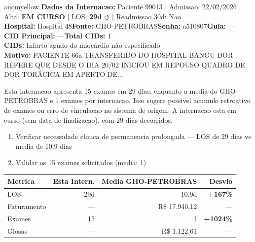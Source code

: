\documentclass[a4paper,10pt]{article}
\begin{document}
\begin{anomalycard}[Internacao 166494 | GHO-PETROBRAS | MODERADO (z=2.42)]{anomyellow}
\textbf{Dados da Internacao:} Paciente 99013 $\mid$ Admissao: 22/02/2026 $\mid$ Alta: \textcolor{anomorange}{\textbf{EM CURSO}} $\mid$ LOS: \textbf{29d \textcolor{anomorange}{$\circlearrowleft$}} $\mid$ Readmissao 30d: Nao\\
\textbf{Hospital:} Hospital 48\quad\textbf{Fonte:} GHO-PETROBRAS\quad\textbf{Senha:} a510807\quad\textbf{Guia:} ---\\
\textbf{CID Principal:} {\small ---}\quad\textbf{Total CIDs:} 1\\

\textbf{CIDs:} {\scriptsize Infarto agudo do miocárdio não especificado}\\

\textbf{Motivo:} {\scriptsize PACIENTE 66a TRANSFERIDO DO HOSPITAL BANGU DOR REFERE QUE DESDE O DIA 20/02 INICIOU EM REPOUSO QUADRO DE DOR TORÁCICA EM APERTO DE...}\\

\vspace{2pt}\begin{tcolorbox}[colback=severityred!20,colframe=anomyellow,title={\textbf{Interpretacao de Negocio}},fonttitle=\bfseries\small,left=4pt,right=4pt,top=3pt,bottom=3pt]
{\small Esta internacao apresenta 15 exames em 29 dias, enquanto a media do GHO-PETROBRAS e 1 exames por internacao. Isso sugere possivel acumulo retroativo de exames ou erro de vinculacao no sistema de origem. A internacao esta em curso (sem data de finalizacao), com 29 dias decorridos.}
\end{tcolorbox}
\begin{tcolorbox}[colback=severityyellow!30,colframe=anomorange,title={\textbf{Recomendacoes Especificas}},fonttitle=\bfseries\small,left=4pt,right=4pt,top=3pt,bottom=3pt]
\begin{enumerate}[nosep,leftmargin=16pt]
\item {\small Verificar necessidade clinica de permanencia prolongada --- LOS de 29 dias vs media de 10.9 dias}
\item {\small Validar os 15 exames solicitados (media: 1)}
\end{enumerate}
\end{tcolorbox}
\begin{center}\begin{tabular}{l r r r}\toprule\textbf{Metrica} & \textbf{Esta Intern.} & \textbf{Media GHO-PETROBRAS} & \textbf{Desvio} \\\midrule
LOS & 29d & 10.9d & \textcolor{anomred}{\textbf{+167\%}} \\
Faturamento & --- & R\$ 17.940,12 & --- \\
Exames & 15 & 1 & \textcolor{anomred}{\textbf{+1024\%}} \\
Glosas & --- & R\$ 1.122,61 & --- \\
\bottomrule\end{tabular}\end{center}


\end{anomalycard}
\end{document}
